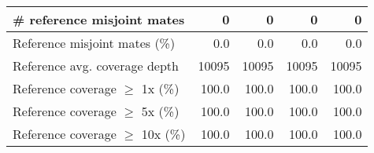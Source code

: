 \documentclass[12pt,a4paper]{article}
\begin{document}
\begin{table}[ht]
\begin{center}
\begin{tabular}{|l*{4}{|r}|}
\# reference misjoint mates & 0 & 0 & 0 & 0 \\ \hline
Reference misjoint mates (\%) & 0.0 & 0.0 & 0.0 & 0.0 \\ \hline
Reference avg. coverage depth & 10095 & 10095 & 10095 & 10095 \\ \hline
Reference coverage $\geq$ 1x (\%) & 100.0 & 100.0 & 100.0 & 100.0 \\ \hline
Reference coverage $\geq$ 5x (\%) & 100.0 & 100.0 & 100.0 & 100.0 \\ \hline
Reference coverage $\geq$ 10x (\%) & 100.0 & 100.0 & 100.0 & 100.0 \\ \hline
\end{tabular}
\end{center}
\end{table}
\end{document}
